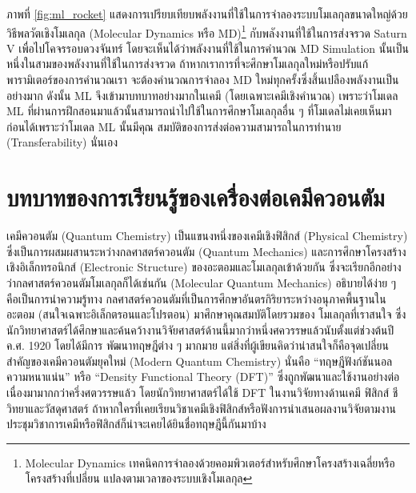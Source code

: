 ภาพที่ \ref{fig:ml_rocket} แสดงการเปรียบเทียบพลังงานที่ใช้ในการจำลองระบบโมเลกุลขนาดใหญ่ด้วยวิธีพลวัตเชิงโมเลกุล (Molecular 
Dynamics หรือ MD)\footnote{Molecular Dynamics เทคนิคการจำลองด้วยคอมพิวเตอร์สำหรับศึกษาโครงสร้างเฉลี่ยหรือโครงสร้างที่เปลี่ยน%
แปลงตามเวลาของระบบเชิงโมเลกุล} กับพลังงานที่ใช้ในการส่งจรวด Saturn V เพื่อไปโคจรรอบดวงจันทร์ โดยจะเห็นได้ว่าพลังงานที่ใช้ในการคำนวณ 
MD Simulation นั้นเป็นหนึ่งในสามของพลังงานที่ใช้ในการส่งจรวด ถ้าหากเราการที่จะศึกษาโมเลกุลใหม่หรือปรับแก้พารามิเตอร์ของการคำนวณเรา%
จะต้องคำนวณการจำลอง MD ใหม่ทุกครั้งซึ่งสิ้นเปลืองพลังงานเป็นอย่างมาก ดังนั้น ML จึงเข้ามาบทบาทอย่างมากในเคมี (โดยเฉพาะเคมีเชิงคำนวณ) 
เพราะว่าโมเดล ML ที่ผ่านการฝึกสอนมาแล้วนั้นสามารถนำไปใช้ในการศึกษาโมเลกุลอื่น ๆ ที่โมเดลไม่เคยเห็นมาก่อนได้เพราะว่าโมเดล ML นั้นมีคุณ%
สมบัติของการส่งต่อความสามารถในการทำนาย (Transferability) นั่นเอง

\section{บทบาทของการเรียนรู้ของเครื่องต่อเคมีควอนตัม}
\label{sec:ml_in_qm}

เคมีควอนตัม (Quantum Chemistry) เป็นแขนงหนึ่งของเคมีเชิงฟิสิกส์ (Physical Chemistry) ซึ่งเป็นการผสมผสานระหว่างกลศาสตร์ควอนตัม 
(Quantum Mechanics) และการศึกษาโครงสร้างเชิงอิเล็กทรอนิกส์ (Electronic Structure) ของอะตอมและโมเลกุลเข้าด้วยกัน 
ซึ่งจะเรียกอีกอย่างว่ากลศาสตร์ควอนตัมโมเลกุลก็ได้เช่นกัน (Molecular Quantum Mechanics) อธิบายได้ง่าย ๆ คือเป็นการนำความรู้ทาง%
กลศาสตร์ควอนตัมที่เป็นการศึกษาอันตรกิริยาระหว่างอนุภาคพื้นฐานในอะตอม (สนใจเฉพาะอิเล็กตรอนและโปรตอน) มาศึกษาคุณสมบัติโดยรวมของ%
โมเลกุลที่เราสนใจ ซึ่งนักวิทยาศาสตร์ได้ศึกษาและค้นคว้างานวิจัยศาสตร์ด้านนี้มากว่าหนึ่งศควรรษแล้วนับตั้งแต่ช่วงต้นปี ค.ศ. 1920 โดยได้มีการ%
พัฒนาทฤษฎีต่าง ๆ มากมาย แต่สิ่งที่ผู้เขียนคิดว่าน่าสนใจก็คือจุดเปลี่ยนสำคัญของเคมีควอนตัมยุคใหม่ (Modern Quantum Chemistry) นั่นคือ 
\enquote{ทฤษฎีฟังก์ชันนอลความหนาแน่น} หรือ \enquote{Density Functional Theory (DFT)}\autocite{kohn1996} 
ซึ่งถูกพัฒนาและใช้งานอย่างต่อเนื่องมามากกว่าครึ่งศตวรรษแล้ว โดยนักวิทยาศาสตร์ได้ใช้ DFT ในงานวิจัยทางด้านเคมี ฟิสิกส์ ชีวิทยาและวัสดุศาสตร์ 
ถ้าหากใครที่เคยเรียนวิชาเคมีเชิงฟิสิกส์หรือฟังการนำเสนอผลงานวิจัยตามงานประชุมวิชาการเคมีหรือฟิสิกส์ก็น่าจะเคยได้ยินชื่อทฤษฎีนี้กันมาบ้าง 

